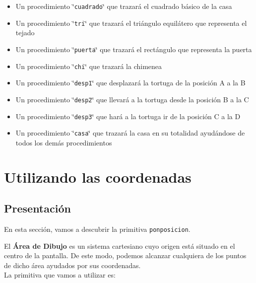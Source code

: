 \documentclass[12pt,twoside,spanish,a4paper]{report}
\begin{document}
\begin{itemize}
   \item Un procedimiento \char`\"{}\texttt{cuadrado}\char`\"{} que trazar\'a
      el cuadrado b\'asico de la casa
   \item Un procedimiento \char`\"{}\texttt{tri}\char`\"{} que trazar\'a el
      tri\'angulo equil\'atero que representa el tejado %
   \item Un procedimiento \char`\"{}\texttt{puerta}\char`\"{} que trazar\'a el
      rect\'angulo que representa la puerta %
   \item Un procedimiento \char`\"{}\texttt{chi}\char`\"{} que trazar\'a la
      chimenea
   \item Un procedimiento \char`\"{}\texttt{desp1}\char`\"{} que desplazar\'a la
      tortuga de la posici\'on A a la B
   \item Un procedimiento \char`\"{}\texttt{desp2}\char`\"{} que llevar\'a a la
      tortuga desde la posici\'on B a la C
   \item Un procedimiento \char`\"{}\texttt{desp3}\char`\"{} que har\'a a la
      tortuga ir de la posici\'on C a la D
   \item Un procedimiento \char`\"{}\texttt{casa}\char`\"{} que trazar\'a la
      casa en su totalidad ayud\'andose de todos los dem\'as procedimientos
\end{itemize}

\newpage{}

\chapter{Utilizando las coordenadas}
    \label{sec:Utilizando-coordenadas}

\section{Presentaci\'on}
   \label{sub:Presentacion}

% 
En esta secci\'on, vamos a descubrir la primitiva \texttt{ponposicion}.

El \textbf{\'Area de Dibujo} es un sistema cartesiano cuyo origen est\'a
situado en el centro de la pantalla. De este modo, podemos alcanzar
cualquiera de los puntos de dicho \'area ayudados por sus coordenadas.\\

\noindent La primitiva que vamos a utilizar es:
\end{document}
